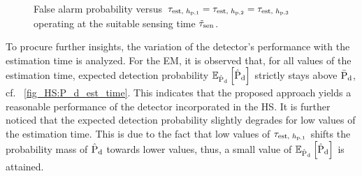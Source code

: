 \begin{figure}[!t]

\centering
{}
\caption{False alarm probability versus $\tau_{\text{est, $h_{\text{p,1}}$}} = \tau_{\text{est, $h_{\text{p,2}}$}} = \tau_{\text{est, $h_{\text{p,3}}$}}$ operating at the suitable sensing time $\tilde{\tau}_{\text{sen}}$.}
\label{fig_HS:P_f_est_time}
\end{figure}

To procure further insights, the variation of the detector's performance with the estimation time is analyzed. For the EM, it is observed that, for all values of the estimation time, expected detection probability ${\mathbb E}_{\hat{\text{P}}_{\text{d}}}\left[ \hat{\text{P}}_{\text{d}} \right]$ strictly stays above $\bar{\text{P}}_{\text{d}}$, cf. \figurename~\ref{fig_HS:P_d_est_time}. This indicates that the proposed approach yields a reasonable performance of the detector incorporated in the HS. It is further noticed that the expected detection probability slightly degrades for low values of the estimation time. This is due to the fact that low values of $\tau_{\text{est, $h_{\text{p,1}}$}}$ shifts the probability mass of $\hat{\text{P}}_{\text{d}}$ towards lower values, thus, a small value of ${\mathbb E}_{\hat{\text{P}}_{\text{d}}}\left[ \hat{\text{P}}_{\text{d}} \right]$ is attained. 


